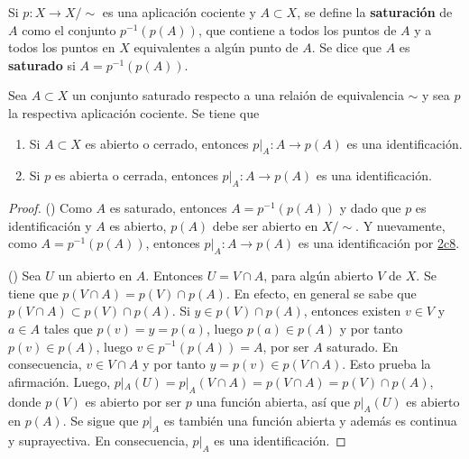 

\begin{definition}
Si $p : X \longrightarrow X/\sim$ es una aplicación cociente y $A \subset X$, se define la \textbf{saturación} de $A$ como el conjunto $p^{-1}(p(A))$, que contiene a todos los puntos de $A$ y a todos los puntos en $X$ equivalentes a algún punto de $A$. Se dice que $A$ es \textbf{saturado} si $A = p^{-1}(p(A))$.
\end{definition}

\begin{proposition}
Sea $A \subset X$ un conjunto saturado respecto a una relaión de equivalencia $\sim$ y sea $p$ la respectiva aplicación cociente. Se tiene que
\begin{enumerate}[label=\textnormal{(\roman*)}]
\item Si $A \subset X$ es abierto o cerrado, entonces $p|_A : A \longrightarrow p(A)$ es una identificación.
\item Si $p$ es abierta o cerrada, entonces $p|_A : A \longrightarrow p(A)$ es una identificación.
\end{enumerate}
\end{proposition}

\begin{proof}
({\scshape{}}) Como $A$ es saturado, entonces $A = p^{-1}(p(A))$ y dado que $p$ es identificación y $A$ es abierto, $p(A)$ debe ser abierto en $X/\sim$. Y nuevamente, como $A = p^{-1}(p(A))$, entonces $p|_A : A \longrightarrow p(A)$ es una identificación por \hyperref[card:2c8]{\textsf{2c8}}.
\bigskip

({\scshape{}}) Sea $U$ un abierto en $A$. Entonces $U = V \cap A$, para algún abierto $V$ de $X$. Se tiene que $p(V \cap A) = p(V) \cap p(A)$. En efecto, en general se sabe que $p(V \cap A) \subset p(V) \cap p(A)$. Si $y \in p(V) \cap p(A)$, entonces existen $v \in V$ y $a \in A$ tales que $ p(v) = y = p(a)$, luego $p(a) \in p(A)$ y por tanto $p(v) \in p(A)$, luego $v \in p^{-1}(p(A)) = A$, por ser $A$ saturado. En consecuencia, $v \in V \cap A$ y por tanto $y = p(v) \in p(V \cap A)$. Esto prueba la afirmación. Luego, $p|_A(U) = p|_A(V \cap A) = p(V \cap A) = p(V) \cap p(A)$, donde $p(V)$ es abierto por ser $p$ una función abierta, así que $p|_A(U)$ es abierto en $p(A)$. Se sigue que $p|_A$ es también una función abierta y además es continua y suprayectiva. En consecuencia, $p|_A$ es una identificación.
\end{proof}
